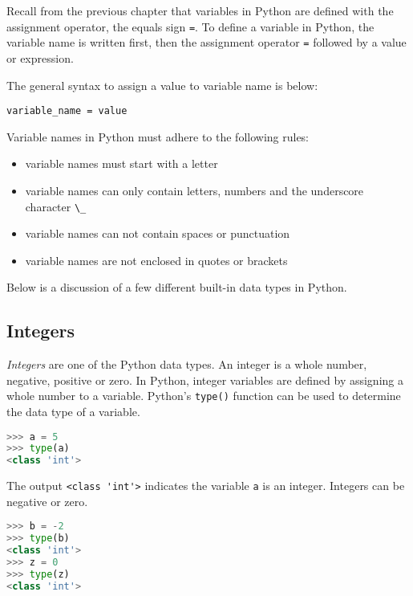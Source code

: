 \documentclass{book}
\providecommand{\tightlist}{%
      \setlength{\itemsep}{0pt}\setlength{\parskip}{0pt}}
\newcommand{\passthrough}[1]{#1}
\begin{document}
Recall from the previous chapter that variables in Python are defined
with the assignment operator, the equals sign
\passthrough{\lstinline!=!}. To define a variable in Python, the
variable name is written first, then the assignment operator
\passthrough{\lstinline!=!} followed by a value or expression.

The general syntax to assign a value to variable name is below:

\begin{lstlisting}
variable_name = value
\end{lstlisting}

Variable names in Python must adhere to the following rules:

\begin{itemize}
\tightlist
\item
  variable names must start with a letter
\item
  variable names can only contain letters, numbers and the underscore
  character \passthrough{\lstinline!\_!}
\item
  variable names can not contain spaces or punctuation
\item
  variable names are not enclosed in quotes or brackets
\end{itemize}

Below is a discussion of a few different built-in data types in Python.
    




    
        \hypertarget{integers}{%
\subsection{Integers}\label{integers}}

\emph{Integers} are one of the Python data types. An integer is a whole
number, negative, positive or zero. In Python, integer variables are
defined by assigning a whole number to a variable. Python's
\passthrough{\lstinline!type()!} function can be used to determine the
data type of a variable.

\begin{lstlisting}[language=Python]
>>> a = 5
>>> type(a)
<class 'int'>
\end{lstlisting}

The output \passthrough{\lstinline!<class 'int'>!} indicates the
variable \passthrough{\lstinline!a!} is an integer. Integers can be
negative or zero.

\begin{lstlisting}[language=Python]
>>> b = -2
>>> type(b)
<class 'int'>
>>> z = 0
>>> type(z)
<class 'int'>
\end{lstlisting}
    
\end{document}
